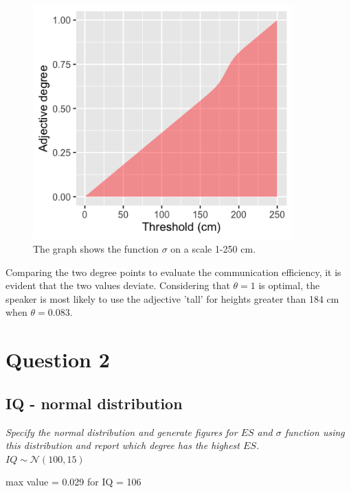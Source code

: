 \documentclass[11pt,a4paper,oneside]{article}
\begin{document}
\begin{figure}[H]
    \centering
    \includegraphics[width=100mm]{figs/Question_1_sigma.png}
    \caption{The graph shows the function $\sigma$ on a scale 1-250 cm.}
  \label{fig:q1_sigma}
\end{figure}

Comparing the two degree points to evaluate the communication efficiency, it is evident that the two values deviate. Considering that $\theta = 1$ is optimal, the speaker is most likely to use the adjective 'tall' for heights greater than 184 cm when $\theta = 0.083$. 

\section{Question 2}
\label{Q2}
\subsection{IQ - normal distribution}
\textit{Specify the normal distribution and generate figures for $ES$ and $\sigma$ function using this distribution and report which degree has the highest $ES$.}\\

$IQ \sim \mathcal{N}(100, 15)$

max value = 0.029 for IQ = 106
\end{document}
